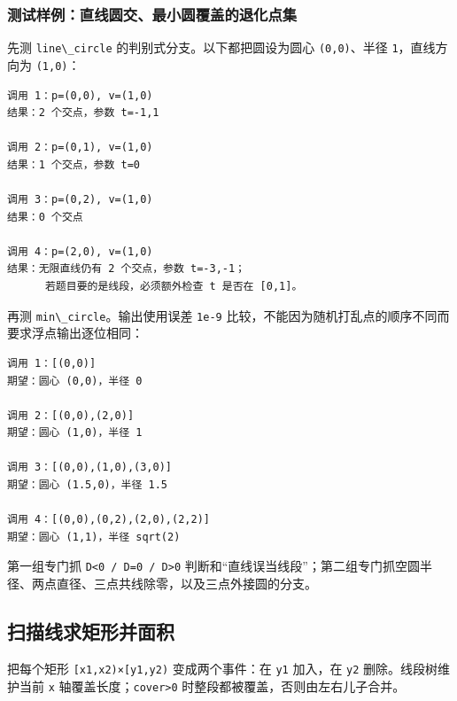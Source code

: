 \subsubsection{测试样例：直线圆交、最小圆覆盖的退化点集}

先测 \passthrough{\lstinline!line\_circle!} 的判别式分支。以下都把圆设为圆心 \passthrough{\lstinline!(0,0)!}、半径 \passthrough{\lstinline!1!}，直线方向为 \passthrough{\lstinline!(1,0)!}：

\begin{lstlisting}
调用 1：p=(0,0), v=(1,0)
结果：2 个交点，参数 t=-1,1

调用 2：p=(0,1), v=(1,0)
结果：1 个交点，参数 t=0

调用 3：p=(0,2), v=(1,0)
结果：0 个交点

调用 4：p=(2,0), v=(1,0)
结果：无限直线仍有 2 个交点，参数 t=-3,-1；
      若题目要的是线段，必须额外检查 t 是否在 [0,1]。
\end{lstlisting}

再测 \passthrough{\lstinline!min\_circle!}。输出使用误差 \passthrough{\lstinline!1e-9!} 比较，不能因为随机打乱点的顺序不同而要求浮点输出逐位相同：

\begin{lstlisting}
调用 1：[(0,0)]
期望：圆心 (0,0)，半径 0

调用 2：[(0,0),(2,0)]
期望：圆心 (1,0)，半径 1

调用 3：[(0,0),(1,0),(3,0)]
期望：圆心 (1.5,0)，半径 1.5

调用 4：[(0,0),(0,2),(2,0),(2,2)]
期望：圆心 (1,1)，半径 sqrt(2)
\end{lstlisting}

第一组专门抓 \passthrough{\lstinline!D<0 / D=0 / D>0!} 判断和``直线误当线段''；第二组专门抓空圆半径、两点直径、三点共线除零，以及三点外接圆的分支。


\subsection{扫描线求矩形并面积}

把每个矩形 \passthrough{\lstinline![x1,x2)×[y1,y2)!} 变成两个事件：在 \passthrough{\lstinline!y1!} 加入，在 \passthrough{\lstinline!y2!} 删除。线段树维护当前 \passthrough{\lstinline!x!} 轴覆盖长度；\passthrough{\lstinline!cover>0!} 时整段都被覆盖，否则由左右儿子合并。


